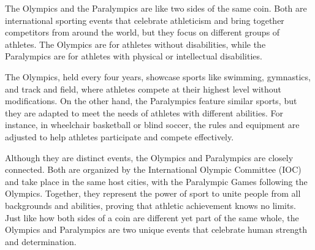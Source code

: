 \documentclass[12pt]{article}
\begin{document}
\begin{tcolorbox}[colframe=black!60, colback=white, 
coltitle=black, colbacktitle=black!15, fonttitle=\bfseries\Large, 
title=Text: The Olympics and the Paralympics, halign title=center, left=10pt, right=10pt, top=10pt, bottom=15pt]
The Olympics and the Paralympics are like two sides of the same coin. Both are international sporting events that celebrate athleticism and bring together competitors from around the world, but they focus on different groups of athletes. The Olympics are for athletes without disabilities, while the Paralympics are for athletes with physical or intellectual disabilities.

The Olympics, held every four years, showcase sports like swimming, gymnastics, and track and field, where athletes compete at their highest level without modifications. On the other hand, the Paralympics feature similar sports, but they are adapted to meet the needs of athletes with different abilities. For instance, in wheelchair basketball or blind soccer, the rules and equipment are adjusted to help athletes participate and compete effectively.

Although they are distinct events, the Olympics and Paralympics are closely connected. Both are organized by the International Olympic Committee (IOC) and take place in the same host cities, with the Paralympic Games following the Olympics. Together, they represent the power of sport to unite people from all backgrounds and abilities, proving that athletic achievement knows no limits. Just like how both sides of a coin are different yet part of the same whole, the Olympics and Paralympics are two unique events that celebrate human strength and determination.

 

 
 

 
\end{tcolorbox}
\vspace{1em}
\end{document}
